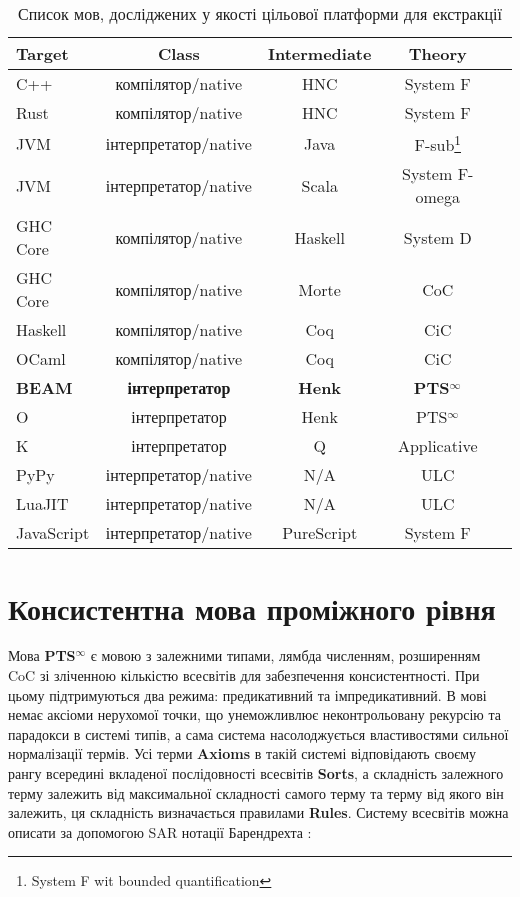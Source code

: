\documentclass{article}
\begin{document}
\begin{table}[h]
\begin{center}
\caption{Список мов, досліджених у якості цільової платформи для екстракції}
\label{tab:a}
\begin{tabular}{lcccc}
\hline
{\bf Target} & {\bf Class} & {\bf Intermediate} & {\bf Theory}\\
\hline
C++        & компілятор/native      & HNC & System F\\
Rust       & компілятор/native      & HNC & System F\\
JVM        & інтерпретатор/native   & Java    & F-sub\footnote{System F wit bounded quantification}\\
JVM        & інтерпретатор/native   & Scala   & System F-omega\\
GHC Core   & компілятор/native      & Haskell & System D\\
GHC Core   & компілятор/native      & Morte   & CoC\\
Haskell    & компілятор/native      & Coq     & CiC\\
OCaml      & компілятор/native      & Coq     & CiC\\
{\bf BEAM} & {\bf інтерпретатор} & {\bf Henk}   & {\bf PTS$^\infty$} \\
O          & інтерпретатор          & Henk  & PTS$^\infty$ \\
K          & інтерпретатор          & Q   & Applicative \\
PyPy       & інтерпретатор/native   & N/A & ULC \\
LuaJIT     & інтерпретатор/native   & N/A & ULC \\
JavaScript & інтерпретатор/native & PureScript & System F\\
\hline
\end{tabular}
\end{center}
\end{table}

\section{Консистентна мова проміжного рівня}
Мова \textbf{PTS$^\infty$} є мовою з залежними типами, лямбда численням, розширенням CoC зі зліченною кількістю всесвітів для забезпечення консистентності.
При цьому підтримуються два режима: предикативний та імпредикативний. В мові немає аксіоми нерухомої точки, що унеможливлює неконтрольовану рекурсію та парадокси в системі типів,
а сама система насолоджується властивостями сильної нормалізації термів.
Усі терми {\bf Axioms} в такій системі відповідають своєму рангу всередині вкладеної послідовності всесвітів {\bf Sorts},
а складність залежного терму залежить від максимальної складності самого терму та терму від якого він залежить, ця складність визначається
правилами {\bf Rules}. Систему всесвітів можна описати за допомогою SAR нотації Барендрехта \cite{Henk93}:
\end{document}
